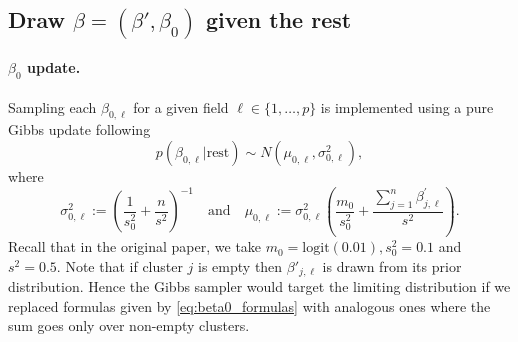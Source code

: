 \documentclass[ba]{imsart}
\begin{document}
\begin{comment}
\begin{algorithm}
 \KwData{$\nu_{j,l}$ for $j = 1,\ldots, n$ and $l = 1,\ldots, L$}
 \KwIn{current state of $\eta, \beta', \beta_0,N$ and $\theta$}
 Keep track of cluster sizes $\texttt{clsize}$ and number of clusters $\texttt{ksize}$\;
 \tcp{update labels for each record}
 \For{$j = 1,\ldots, n$}{
    \If{$\texttt{clsize}[\eta_j] == 1$}{
        $\texttt{ksize} \leftarrow \texttt{ksize} - 1$
    }
    \For{$ q = 1 \ldots n$}{
        \eIf{$\exists i, \eta_i = q$}{
            \tcp{$q$ is an observed cluster}
            $\texttt{psampq}[q] \leftarrow 
            \frac{p(\nu_{z_q}\mid \eta, \beta'_q,\theta)}{p(\nu_{z_{q - (j)}} \mid \eta, \beta'_q, \theta)}$ 
            according to Algorithm~\ref{algo:conditional_eta}\;
        }{
            \tcp{$q$ is a new cluster}
            $\texttt{psampq}[q] \leftarrow 
            \prod_{l=1}^L \theta_{l,\nu_{ijl}}\cdot \frac{N- \texttt{ksize}}{ n - \texttt{ksize}}$ \;
        }
    }
    \tcp{couple this step later}
    sample $q$ according to normalized $\texttt{psampq}$\; 
 }
 \tcp{update distortion parameters $\beta'$ and $\beta_0$}
 Details in the paper\;
 \tcp{update population size $N$ - MH with integer proposal}
 Propose $\delta$ from discrete uniform $[-100,100]$\;
 Set $N \leftarrow N + \delta$ if $U < \frac{(N+\delta)_k}{N_k}\cdot (\frac{N}{N+\delta})^{n + g}$ and $(N+\delta) > k$\;
 \tcp{update probability vector $\theta_\ell$ for each column $l$}
 \For{ $l \in 1:L$}{
    sample  $\theta_\ell \sim p(\cdot | \theta_{(-l)}, \eta, \beta',\beta_0,N,\nu)$ according to~\eqref{eq:theta_conditional} with Dirichlet proposal. 
 }
 \caption{One iteration for the Gibbs sampler for the joint posterior~\eqref{eq:posteriorfactorization}.}
 \label{algo:gibbs_joint}
\end{algorithm}
\end{comment}

\subsection{Draw $\beta = (\beta', \beta_0)$ given the rest}
\paragraph{$\beta_{0}$ update.} Sampling each $\beta_{0,\ell}$ for a given field $\ell \in \{ 1, \ldots, p \} $ is implemented using a pure Gibbs update following
$$p\left(\beta_{0,\ell}|\text{rest}\right)\sim N(\mu_{0,\ell}, \sigma_{0,\ell}^2),$$
where
\begin{equation}\label{eq:beta0_formulas}
\sigma_{0,\ell}^2 := \left(\frac{1}{s_0^2} + \frac{n}{s^2} \right)^{-1} \quad \text{and} \quad \mu_{0,\ell} := \sigma_{0,\ell}^2 \left(\frac{m_0}{s_0^2} + \frac{\sum_{j=1}^{n} \beta^{'}_{j,\ell}}{s^2} \right).
\end{equation}
 Recall that in the original paper, we take $m_0 = \text{logit}(0.01), s_0^2 = 0.1$ and $s^2 =0.5$. Note that if cluster $j$ is empty then $\beta'_{j,\ell}$ is drawn from its prior distribution. Hence the Gibbs sampler would target the limiting distribution if we replaced formulas given by \eqref{eq:beta0_formulas} with analogous ones where the sum goes only over non-empty clusters.
\end{document}
